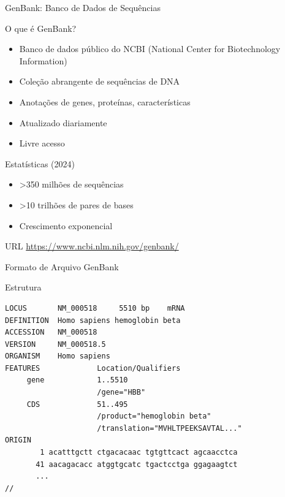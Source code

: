 \begin{frame}[shrink=10]{GenBank: Banco de Dados de Sequências}
\begin{block}{O que é GenBank?}
\begin{itemize}
    \item Banco de dados público do NCBI (National Center for Biotechnology Information)
    \item Coleção abrangente de sequências de DNA
    \item Anotações de genes, proteínas, características
    \item Atualizado diariamente
    \item Livre acesso
\end{itemize}
\end{block}

\vspace{0.3cm}

\begin{exampleblock}{Estatísticas (2024)}
\begin{itemize}
    \item \textgreater 350 milhões de sequências
    \item \textgreater 10 trilhões de pares de bases
    \item Crescimento exponencial
\end{itemize}
\end{exampleblock}

\vspace{0.3cm}

\begin{block}{URL}
\url{https://www.ncbi.nlm.nih.gov/genbank/}
\end{block}
\end{frame}

\begin{frame}[fragile, shrink=15]{Formato de Arquivo GenBank}
\begin{block}{Estrutura}
\begin{verbatim}
LOCUS       NM_000518     5510 bp    mRNA
DEFINITION  Homo sapiens hemoglobin beta
ACCESSION   NM_000518
VERSION     NM_000518.5
ORGANISM    Homo sapiens
FEATURES             Location/Qualifiers
     gene            1..5510
                     /gene="HBB"
     CDS             51..495
                     /product="hemoglobin beta"
                     /translation="MVHLTPEEKSAVTAL..."
ORIGIN
        1 acatttgctt ctgacacaac tgtgttcact agcaacctca
       41 aacagacacc atggtgcatc tgactcctga ggagaagtct
       ...
//
\end{verbatim}
\end{block}
\end{frame}

